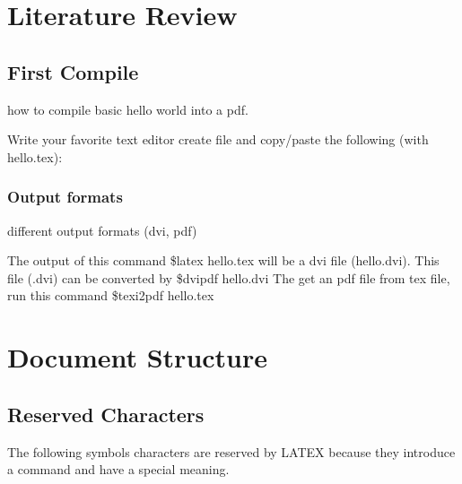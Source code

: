 \documentclass{report}
\begin{document}
 
\tableofcontents{}
 

 	\chapter{Literature Review}


 \section{First Compile}
how to compile basic hello world into a pdf.
 
Write your favorite text editor create file and copy/paste the following (with hello.tex):
 
\subsection{Output formats}
 
different output formats (dvi, pdf)
 
The output of this command \$latex hello.tex will be a dvi 
file (hello.dvi). This file (.dvi) can be converted by \$dvipdf 
hello.dvi The get an pdf file from tex file, run this 
command \$texi2pdf hello.tex
 
\chapter{Document Structure}
 
\section{Reserved Characters}
 
The following symbols characters are reserved by LATEX because 
they introduce a command and have a special meaning.
 
\end{document}

